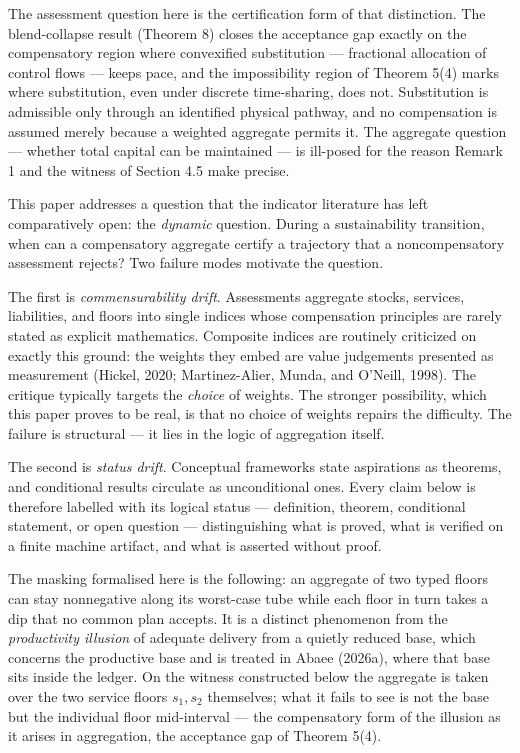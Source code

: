 \documentclass[11pt]{article}
\begin{document}
The assessment question here is the certification form of that
distinction. The blend-collapse result (Theorem 8) closes the acceptance
gap exactly on the compensatory region where convexified substitution
--- fractional allocation of control flows --- keeps pace, and the
impossibility region of Theorem 5(4) marks where substitution, even
under discrete time-sharing, does not. Substitution is admissible only
through an identified physical pathway, and no compensation is assumed
merely because a weighted aggregate permits it. The aggregate question
--- whether total capital can be maintained --- is ill-posed for the
reason Remark 1 and the witness of Section 4.5 make precise.

This paper addresses a question that the indicator literature has left
comparatively open: the \emph{dynamic} question. During a sustainability
transition, when can a compensatory aggregate certify a trajectory that
a noncompensatory assessment rejects? Two failure modes motivate the
question.

The first is \emph{commensurability drift}. Assessments aggregate
stocks, services, liabilities, and floors into single indices whose
compensation principles are rarely stated as explicit mathematics.
Composite indices are routinely criticized on exactly this ground: the
weights they embed are value judgements presented as measurement
(Hickel, 2020; Martinez-Alier, Munda, and O'Neill, 1998). The critique
typically targets the \emph{choice} of weights. The stronger
possibility, which this paper proves to be real, is that no choice of
weights repairs the difficulty. The failure is structural --- it lies in
the logic of aggregation itself.

The second is \emph{status drift}. Conceptual frameworks state
aspirations as theorems, and conditional results circulate as
unconditional ones. Every claim below is therefore labelled with its
logical status --- definition, theorem, conditional statement, or open
question --- distinguishing what is proved, what is verified on a finite
machine artifact, and what is asserted without proof.

The masking formalised here is the following: an aggregate of two typed
floors can stay nonnegative along its worst-case tube while each floor
in turn takes a dip that no common plan accepts. It is a distinct
phenomenon from the \emph{productivity illusion} of adequate delivery
from a quietly reduced base, which concerns the productive base and is
treated in Abaee (2026a), where that base sits inside the ledger. On the
witness constructed below the aggregate is taken over the two service
floors \(s_1, s_2\) themselves; what it fails to see is not the base but
the individual floor mid-interval --- the compensatory form of the
illusion as it arises in aggregation, the acceptance gap of Theorem
5(4).
\end{document}
